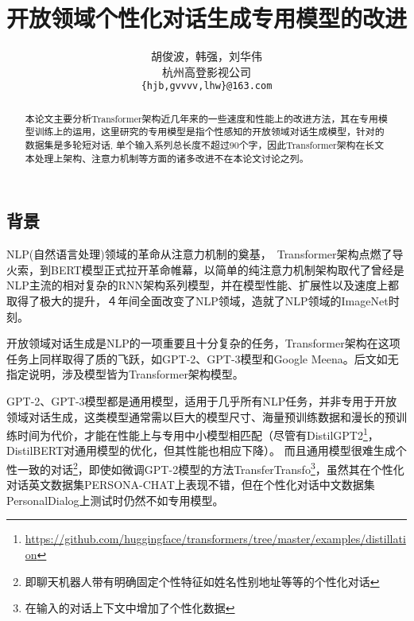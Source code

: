 \documentclass[letterpaper]{article} %
\DeclareRobustCommand{\citeext}[1]{\cite[#1]{#1}}
\begin{document}
\begin{CJK*}{UTF8}{gbsn}

\title{开放领域个性化对话生成专用模型的改进}
\author{胡俊波，韩强，刘华伟 \\
杭州高登影视公司\\
{\tt \{hjb,gvvvv,lhw\}@163.com} \\}

\maketitle
\begin{abstract}
本论文主要分析Transformer架构近几年来的一些速度和性能上的改进方法，其在专用模型训练上的运用，这里研究的专用模型是指个性感知的开放领域对话生成模型，针对的数据集是多轮短对话, 单个输入系列总长度不超过90个字，因此Transformer架构在长文本处理上架构、注意力机制等方面的诸多改进不在本论文讨论之列。
\end{abstract}

\section[Background]{背景} 
NLP(自然语言处理)领域的革命从注意力机制\citeext{Bahdanau2015}的奠基，~Transformer架构\citeext{Vaswani2017}点燃了导火索，到BERT模型\citeext{Devlin2019}正式拉开革命帷幕，以简单的纯注意力机制架构取代了曾经是NLP主流的相对复杂的RNN架构系列模型，并在模型性能、扩展性以及速度上都取得了极大的提升，４年间全面改变了NLP领域，造就了NLP领域的ImageNet时刻\citeext{ruder2018nlpimagenet}。

开放领域对话生成是NLP的一项重要且十分复杂的任务，Transformer架构在这项任务上同样取得了质的飞跃，如GPT-2、GPT-3模型和Google Meena\citeext{Radford2019, Brown2020, Adiwardana2020}。后文如无指定说明，涉及模型皆为Transformer架构模型。

GPT-2、GPT-3模型都是通用模型，适用于几乎所有NLP任务，并非专用于开放领域对话生成，这类模型通常需以巨大的模型尺寸、海量预训练数据和漫长的预训练时间为代价，才能在性能上与专用中小模型相匹配（尽管有DistilGPT2\footnote{\url{https://github.com/huggingface/transformers/tree/master/examples/distillation}}，DistilBERT\citeext{Sanh2019}对通用模型的优化，但其性能也相应下降）。
而且通用模型很难生成个性一致的对话\footnote{即聊天机器人带有明确固定个性特征如姓名性别地址等等的个性化对话}，即使如微调GPT-2模型\citeext{Radford2019}的方法TransferTransfo\citeext{Wolf2019}\footnote{在输入的对话上下文中增加了个性化数据}，虽然其在个性化对话英文数据集PERSONA-CHAT\citeext{Zhang2018}上表现不错，但在个性化对话中文数据集PersonalDialog\citeext{Zheng2019a}上测试时仍然不如专用模型\citeext{Zheng2019}。


\end{CJK*}
\end{document}
